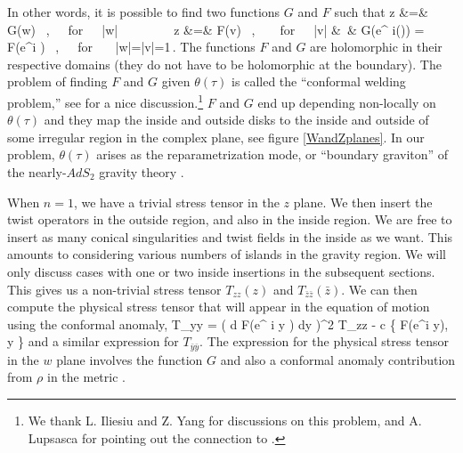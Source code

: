    In other words, it is possible to find two functions $G$ and $F $ such that 
   \bea {}
    z &=& G(w) ~,~~~{\rm for}~~~|w| ~
    \cr  ~~~~~~ z &=& F(v) ~,~~~~{\rm for}~~~|v| 
   \cr
   &~&  G(e^{ i\theta(\tau)}) = F(e^{i\tau} ) ~,~~~{\rm for} ~~~|w|=|v|=1\,.
   \eea
   The functions $F$ and $G$ are holomorphic in their respective domains (they do not have to be holomorphic at the boundary). 
   The problem of finding $F$ and $G$ given $\theta(\tau)$ is called the 
   ``conformal welding problem,'' see \cite{Mumford} for a nice discussion.\footnote{We thank 
   L. Iliesiu and Z. Yang for discussions on this problem, and A. Lupsasca for pointing out the connection to \cite{Mumford}.}  $F$ and $G$   end up depending non-locally on $\theta(\tau)$ and they
     map the inside and outside disks to the inside and outside of some irregular region in the complex plane, see figure \ref{WandZplanes}. In our problem, $\theta(\tau)$ arises as the reparametrization mode, or ``boundary 
     graviton'' of the nearly-$AdS_2$ gravity theory \cite{Jensen:2016pah,Maldacena:2016upp,Engelsoy:2016xyb}.
   
   When $n=1$, we have a trivial stress tensor in the $z$ plane. We then insert the twist operators in the outside region, and also in the inside region. We are free to insert as many
    conical singularities and twist fields in the inside as we want. This amounts to considering various numbers of islands in the gravity region. We will only discuss cases with one or two inside insertions in the subsequent sections. 
     This gives us a non-trivial stress tensor $T_{zz}(z)$ and $T_{\bar z \bar z}(\bar z)$. We can then compute the physical stress tensor that will appear in the equation of motion using the 
   conformal anomaly, 
   \be {}
    T_{yy} = \left( { d F(e^{ i y} ) \over dy } \right)^2 T_{zz} - 
    { c  \pi } \{ F(e^{i y}), y \} 
    \ee
    and a similar expression for $T_{\bar y \bar y } $. The expression for the physical stress tensor in the $w$ plane  involves the function $G$ and also a conformal anomaly contribution from $\rho$ in the metric .
    
